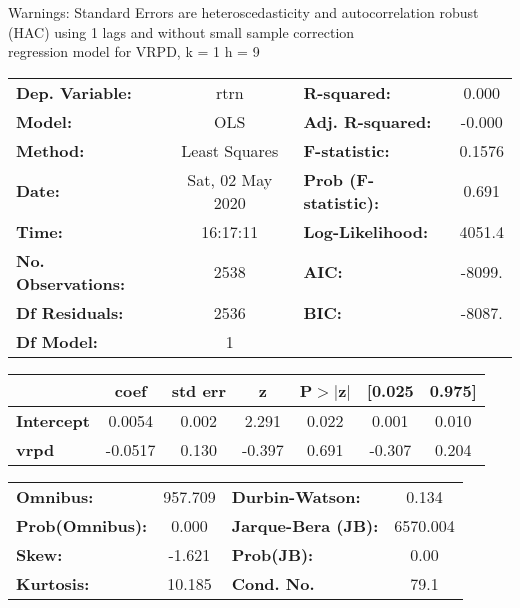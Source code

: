 Warnings: \newline
 [1] Standard Errors are heteroscedasticity and autocorrelation robust (HAC) using 1 lags and without small sample correction\\ 

regression model for VRPD, k = 1 h = 9\begin{center}
\begin{tabular}{lclc}
\toprule
\textbf{Dep. Variable:}    &       rtrn       & \textbf{  R-squared:         } &     0.000   \\
\textbf{Model:}            &       OLS        & \textbf{  Adj. R-squared:    } &    -0.000   \\
\textbf{Method:}           &  Least Squares   & \textbf{  F-statistic:       } &    0.1576   \\
\textbf{Date:}             & Sat, 02 May 2020 & \textbf{  Prob (F-statistic):} &    0.691    \\
\textbf{Time:}             &     16:17:11     & \textbf{  Log-Likelihood:    } &    4051.4   \\
\textbf{No. Observations:} &        2538      & \textbf{  AIC:               } &    -8099.   \\
\textbf{Df Residuals:}     &        2536      & \textbf{  BIC:               } &    -8087.   \\
\textbf{Df Model:}         &           1      & \textbf{                     } &             \\
\bottomrule
\end{tabular}
\begin{tabular}{lcccccc}
                   & \textbf{coef} & \textbf{std err} & \textbf{z} & \textbf{P$> |$z$|$} & \textbf{[0.025} & \textbf{0.975]}  \\
\midrule
\textbf{Intercept} &       0.0054  &        0.002     &     2.291  &         0.022        &        0.001    &        0.010     \\
\textbf{vrpd}      &      -0.0517  &        0.130     &    -0.397  &         0.691        &       -0.307    &        0.204     \\
\bottomrule
\end{tabular}
\begin{tabular}{lclc}
\textbf{Omnibus:}       & 957.709 & \textbf{  Durbin-Watson:     } &    0.134  \\
\textbf{Prob(Omnibus):} &   0.000 & \textbf{  Jarque-Bera (JB):  } & 6570.004  \\
\textbf{Skew:}          &  -1.621 & \textbf{  Prob(JB):          } &     0.00  \\
\textbf{Kurtosis:}      &  10.185 & \textbf{  Cond. No.          } &     79.1  \\
\bottomrule
\end{tabular}
\end{center}

